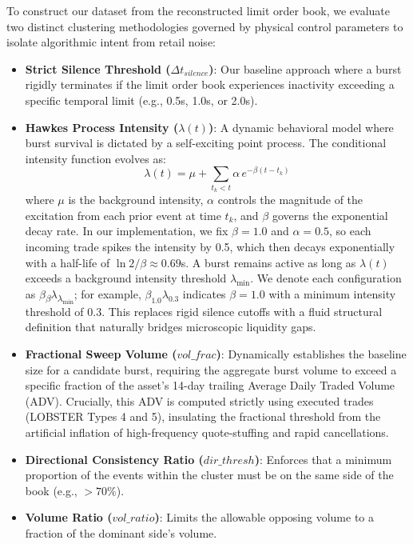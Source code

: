 \documentclass[11pt]{article}
\begin{document}
To construct our dataset from the reconstructed limit order book, we evaluate two distinct clustering methodologies governed by physical control parameters to isolate algorithmic intent from retail noise:

\begin{itemize}
    \item \textbf{Strict Silence Threshold ($\Delta t_{silence}$)}: Our baseline approach where a burst rigidly terminates if the limit order book experiences inactivity exceeding a specific temporal limit (e.g., 0.5s, 1.0s, or 2.0s). 
    \item \textbf{Hawkes Process Intensity ($\lambda(t)$)}: A dynamic behavioral model where burst survival is dictated by a self-exciting point process. The conditional intensity function evolves as:
    \begin{equation}
    \lambda(t) = \mu + \sum_{t_k < t} \alpha \, e^{-\beta(t - t_k)}
    \end{equation}
    where $\mu$ is the background intensity, $\alpha$ controls the magnitude of the excitation from each prior event at time $t_k$, and $\beta$ governs the exponential decay rate. In our implementation, we fix $\beta=1.0$ and $\alpha=0.5$, so each incoming trade spikes the intensity by 0.5, which then decays exponentially with a half-life of $\ln 2 / \beta \approx 0.69$s. A burst remains active as long as $\lambda(t)$ exceeds a background intensity threshold $\lambda_{\min}$. We denote each configuration as $\beta$\textsubscript{$\beta$}$\lambda$\textsubscript{$\lambda_{\min}$}; for example, $\beta_{1.0}\lambda_{0.3}$ indicates $\beta=1.0$ with a minimum intensity threshold of 0.3. This replaces rigid silence cutoffs with a fluid structural definition that naturally bridges microscopic liquidity gaps.
    \item \textbf{Fractional Sweep Volume ($vol\_frac$)}: Dynamically establishes the baseline size for a candidate burst, requiring the aggregate burst volume to exceed a specific fraction of the asset's 14-day trailing Average Daily Traded Volume (ADV). Crucially, this ADV is computed strictly using executed trades (LOBSTER Types 4 and 5), insulating the fractional threshold from the artificial inflation of high-frequency quote-stuffing and rapid cancellations.
    \item \textbf{Directional Consistency Ratio ($dir\_thresh$)}: Enforces that a minimum proportion of the events within the cluster must be on the same side of the book (e.g., $> 70\%$).
    \item \textbf{Volume Ratio ($vol\_ratio$)}: Limits the allowable opposing volume to a fraction of the dominant side's volume.

\end{itemize}
\end{document}
